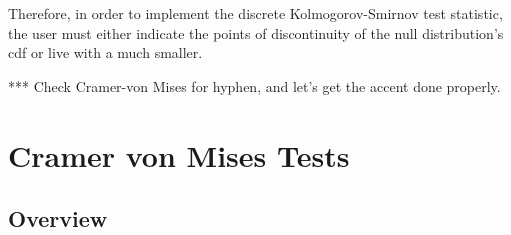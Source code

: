 \documentclass[article]{jss}
\begin{document}
Therefore, in order to implement the discrete Kolmogorov-Smirnov test statistic, the user must either indicate the points of discontinuity of the null
distribution's cdf or live with a much smaller.



*** Check Cramer-von Mises for hyphen, and let's get the accent done properly.

\section{Cramer von Mises Tests}

\subsection{Overview}
\end{document}
